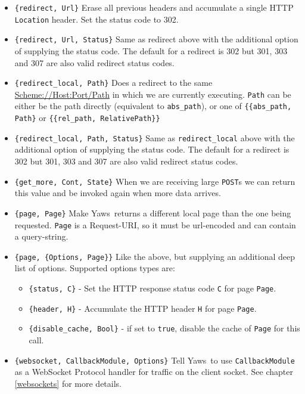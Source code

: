 \documentclass[11pt,oneside,english]{book}
\newcommand{\Yaws}            %
        {{\sc Yaws}}
\begin{document}
\begin{itemize}
\item \verb+{redirect, Url}+ Erase all previous headers and accumulate
  a single HTTP \verb+Location+ header. Set the status code to 302.

\item \verb+{redirect, Url, Status}+ Same as redirect above with the
  additional option of supplying the status code. The default for a
  redirect is 302 but 301, 303 and 307 are also valid redirect status
  codes.

\item \verb+{redirect_local, Path}+ Does a redirect to the same
  \url{Scheme://Host:Port/Path} in which we are currently
  executing. \verb+Path+ can be either be the path directly
  (equivalent to \verb+abs_path+), or one of \verb+{{abs_path, Path}+
  or \verb+{{rel_path, RelativePath}}+

\item \verb+{redirect_local, Path, Status}+ Same as
  \verb+redirect_local+ above with the additional option of supplying
  the status code. The default for a redirect is 302 but 301, 303 and
  307 are also valid redirect status codes.

\item \verb+{get_more, Cont, State}+ When we are receiving large
  \verb+POST+s we can return this value and be invoked again when more
  data arrives.

\item \verb+{page, Page}+ Make \Yaws\ returns a different local page than the
  one being requested. \verb+Page+ is a Request-URI, so it must be url-encoded
  and can contain a query-string.

\item \verb+{page, {Options, Page}}+ Like the above, but supplying an
  additional deep list of options.  Supported options types are:

  \begin{itemize}
    \item \verb+{status, C}+ - Set the HTTP response status code \verb+C+ for
      page \verb+Page+.
    \item \verb+{header, H}+ - Accumulate the HTTP header \verb+H+ for page
      \verb+Page+.
    \item \verb+{disable_cache, Bool}+ - if set to \verb+true+, disable the
      cache of \verb+Page+ for this call.
  \end{itemize}

\item \verb+{websocket, CallbackModule, Options}+ Tell \Yaws\  to use
  \verb+CallbackModule+ as a WebSocket Protocol handler for traffic
  on the client socket. See chapter \ref{websockets} for more details.


\end{itemize}
\end{document}
